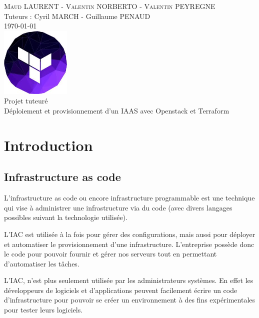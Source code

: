 \documentclass[]{article}
\date{}
\begin{document}
\makeatletter
\begin{titlepage}
\centering
\textsc{Maud LAURENT - Valentin NORBERTO - Valentin PEYREGNE} \\
Tuteurs : Cyril MARCH - Guillaume PENAUD \\
\vspace{1cm}
\textsc{\today}\\
\vspace{5cm}
\includegraphics[width=0.25\textwidth]{Images/download.jpeg} \\
\vspace{1cm}
\Huge{Projet tuteuré \\ Déploiement et provisionnement d’un IAAS avec Openstack et Terraform}\\
\vfill
\end{titlepage}
\makeatother

\tableofcontents
\newpage

\section{Introduction}\label{introduction}

\subsection{Infrastructure as code}\label{infrastructure-as-code}

L'infrastructure as code ou encore \og infrastructure programmable \fg est
une technique qui vise à administrer une infrastructure via du code (avec divers langages possibles suivant la technologie utilisée).

L'IAC est utilisée à la fois pour gérer des configurations, mais aussi pour déployer et automatiser le
provisionnement d'une infrastructure. L'entreprise possède donc le code
pour pouvoir fournir et gérer nos serveurs tout en permettant
d'automatiser les tâches.

L'IAC, n'est plus seulement utilisée par les administrateurs systèmes. En effet les développeurs de logiciels et d'applications
peuvent facilement écrire un code d'infrastructure pour pouvoir se créer
un environnement à des fins expérimentales pour tester leurs logiciels.
\end{document}
